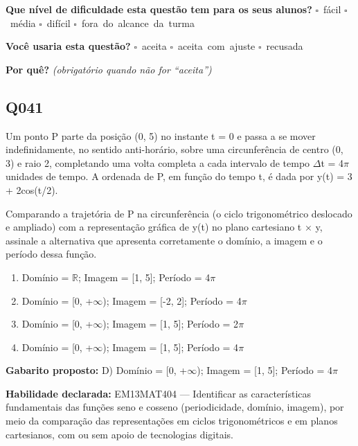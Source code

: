 \documentclass[11pt,a4paper]{article}
\begin{document}
\textbf{Que nível de dificuldade esta questão tem para os seus alunos?}\quad
\mbox{$\square$~fácil} \quad \mbox{$\square$~média} \quad
\mbox{$\square$~difícil} \quad \mbox{$\square$~fora do alcance da turma}

\textbf{Você usaria esta questão?}\quad
\mbox{$\square$~aceita} \quad \mbox{$\square$~aceita com ajuste} \quad
\mbox{$\square$~recusada}

\textbf{Por quê?} \emph{(obrigatório quando não for ``aceita'')}

\underline{\hspace{\linewidth}}

\underline{\hspace{\linewidth}}
\vspace{0.6em}

\begin{samepage}
\subsection*{Q041}
Um ponto P parte da posição (0, 5) no instante t = 0 e passa a se mover indefinidamente, no sentido anti-horário, sobre uma circunferência de centro (0, 3) e raio 2, completando uma volta completa a cada intervalo de tempo $\Delta$t = 4$\pi$ unidades de tempo. A ordenada de P, em função do tempo t, é dada por y(t) = 3 + 2cos(t/2).

Comparando a trajetória de P na circunferência (o ciclo trigonométrico deslocado e ampliado) com a representação gráfica de y(t) no plano cartesiano t × y, assinale a alternativa que apresenta corretamente o domínio, a imagem e o período dessa função.
\begin{enumerate}[label=(\alph*),nosep,leftmargin=*]
\item Domínio = $\mathbb{R}$; Imagem = [1, 5]; Período = 4$\pi$
\item Domínio = [0, +$\infty$); Imagem = [-2, 2]; Período = 4$\pi$
\item Domínio = [0, +$\infty$); Imagem = [1, 5]; Período = 2$\pi$
\item Domínio = [0, +$\infty$); Imagem = [1, 5]; Período = 4$\pi$
\end{enumerate}

\textbf{Gabarito proposto:} D) Domínio = [0, +$\infty$); Imagem = [1, 5]; Período = 4$\pi$

\textbf{Habilidade declarada:} EM13MAT404 --- Identificar as características fundamentais das funções seno e cosseno (periodicidade, domínio, imagem), por meio da comparação das representações em ciclos trigonométricos e em planos cartesianos, com ou sem apoio de tecnologias digitais.
\end{samepage}
\end{document}

